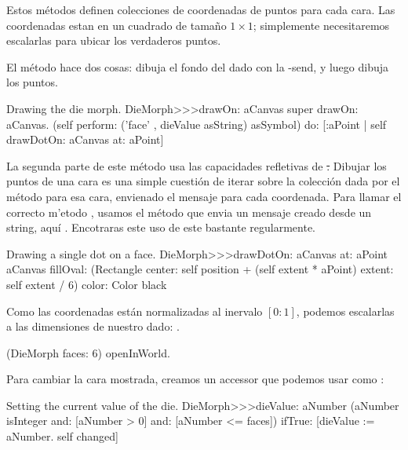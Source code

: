 \documentclass[a4paper,10pt,twoside]{book}
\begin{document}
Estos m\'etodos definen colecciones de coordenadas de puntos para cada cara. Las coordenadas estan en un cuadrado de tamaño $1\times1$; simplemente necesitaremos escalarlas para ubicar los verdaderos puntos.

El m\'etodo  hace dos cosas: dibuja el fondo del dado con la -send, y luego dibuja los puntos.
\begin{method}{Drawing the die morph.}
DieMorph>>>drawOn: aCanvas
	super drawOn: aCanvas.
	(self perform: ('face' , dieValue asString) asSymbol)
		do: [:aPoint | self drawDotOn: aCanvas at: aPoint]
\end{method}

La segunda parte de este m\'etodo usa las capacidades refletivas de \st.
Dibujar los puntos de una cara es una simple cuesti\'on de iterar sobre la colecci\'on dada por el m\'etodo  para esa cara, envienado el mensaje  para cada coordenada. Para llamar el correcto m'etodo , usamos el m\'etodo  que envia un mensaje creado desde un string, aqu\'i . Encotraras este uso de este  bastante regularmente.
\begin{method}{Drawing a single dot on a face.}
DieMorph>>>drawDotOn: aCanvas at: aPoint
	aCanvas
		fillOval: (Rectangle
			center: self position + (self extent * aPoint)
			extent: self extent / 6)
		color: Color black
\end{method}

Como las coordenadas est\'an normalizadas al inervalo $[0{:}1]$, podemos escalarlas a las dimensiones de nuestro dado: .

\begin{code}{}
(DieMorph faces: 6) openInWorld.
\end{code}

Para cambiar la cara mostrada, creamos un accessor que podemos usar como :
\begin{method}{Setting the current value of the die.}
DieMorph>>>dieValue: aNumber
	(aNumber isInteger
			and: [aNumber > 0]
			and: [aNumber <= faces])
		ifTrue:
			[dieValue := aNumber.
			self changed]
\end{method}
\end{document}
